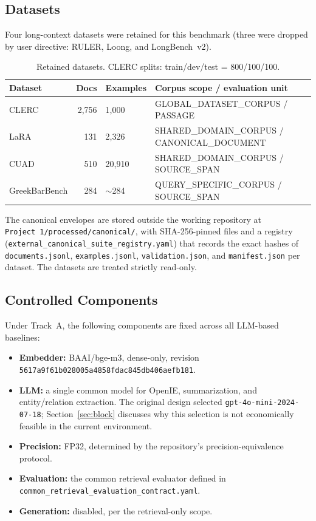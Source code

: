 \documentclass[11pt,a4paper]{article}
\begin{document}
\subsection{Datasets}

Four long-context datasets were retained for this benchmark (three were dropped by user directive: RULER, Loong, and LongBench~v2).

\begin{table}[h]
\centering
\small
\begin{tabularx}{\linewidth}{lrlX}
\toprule
\textbf{Dataset} & \textbf{Docs} & \textbf{Examples} & \textbf{Corpus scope / evaluation unit} \\
\midrule
CLERC            & 2{,}756 & 1{,}000  & GLOBAL\_DATASET\_CORPUS / PASSAGE \\
LaRA             & 131     & 2{,}326  & SHARED\_DOMAIN\_CORPUS / CANONICAL\_DOCUMENT \\
CUAD             & 510     & 20{,}910 & SHARED\_DOMAIN\_CORPUS / SOURCE\_SPAN \\
GreekBarBench    & 284     & $\sim$284 & QUERY\_SPECIFIC\_CORPUS / SOURCE\_SPAN \\
\bottomrule
\end{tabularx}
\caption{Retained datasets. CLERC splits: train/dev/test = 800/100/100.}
\label{tab:datasets}
\end{table}

The canonical envelopes are stored outside the working repository at \texttt{Project~1/processed/canonical/}, with SHA-256-pinned files and a registry (\texttt{external\_canonical\_suite\_registry.yaml}) that records the exact hashes of \texttt{documents.jsonl}, \texttt{examples.jsonl}, \texttt{validation.json}, and \texttt{manifest.json} per dataset. The datasets are treated strictly read-only.

\subsection{Controlled Components}

Under Track~A, the following components are fixed across all LLM-based baselines:

\begin{itemize}[leftmargin=*,nosep]
  \item \textbf{Embedder:} BAAI/bge-m3, dense-only, revision \texttt{5617a9f6\-1b028005\-a4858fda\-c845db40\-6aefb181}.
  \item \textbf{LLM:} a single common model for OpenIE, summarization, and entity/relation extraction. The original design selected \texttt{gpt-4o-mini-2024-07-18}; Section~\ref{sec:block} discusses why this selection is not economically feasible in the current environment.
  \item \textbf{Precision:} FP32, determined by the repository's precision-equivalence protocol.
  \item \textbf{Evaluation:} the common retrieval evaluator defined in \texttt{common\_retrieval\_evaluation\_contract.yaml}.
  \item \textbf{Generation:} disabled, per the retrieval-only scope.
\end{itemize}
\end{document}
